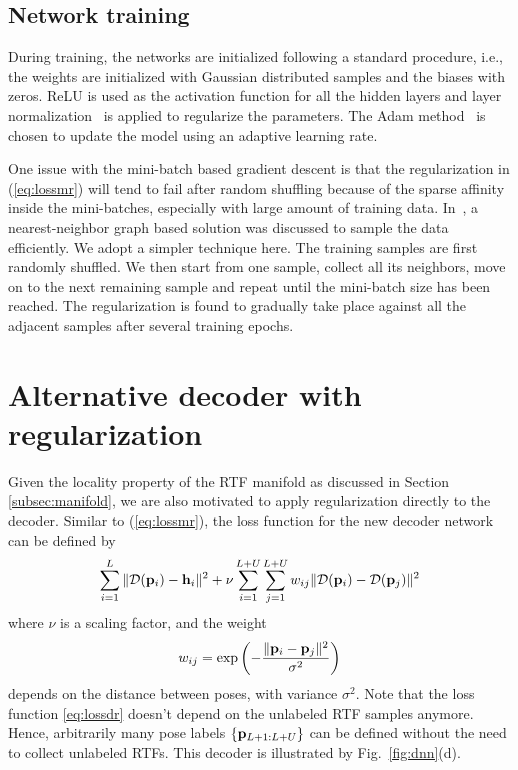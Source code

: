 \documentclass{article}
\begin{document}
\subsection{Network training}
\label{subsec:train}
During training, the networks are initialized following a standard procedure, i.e., the weights are initialized with Gaussian distributed samples and the biases with zeros. ReLU is used as the activation function for all the hidden layers and layer normalization~\cite{ba2016layer} is applied to regularize the parameters. The Adam method~\cite{kingma2014adam} is chosen to update the model using an adaptive learning rate.

One issue with the mini-batch based gradient descent is that the regularization in (\ref{eq:lossmr}) will tend to fail after random shuffling because of the sparse affinity inside the mini-batches, especially with large amount of training data. In~\cite{th2017acoustic}, a nearest-neighbor graph based solution was discussed to sample the data efficiently. We adopt a simpler technique here. The training samples are first randomly shuffled. We then start from one sample, collect all its neighbors, move on to the next remaining sample and repeat until the mini-batch size has been reached. The regularization is found to gradually take place against all the adjacent samples after several training epochs.


\section{Alternative decoder with regularization}
\label{sec:regul}

Given the locality property of the RTF manifold as discussed in Section \ref{subsec:manifold}, we are also motivated to apply regularization directly to the decoder. Similar to (\ref{eq:lossmr}), the loss function for the new decoder network can be defined by
\begin{equation}\label{eq:lossdr}
\sum_{i=1}^{L}\|\mathcal{D}({\bf p}_i)-{\bf h}_i\|^2 + \nu \sum_{i=1}^{L+U}\sum_{j=1}^{L+U}w_{ij}\|\mathcal{D}({\bf p}_i)-\mathcal{D}({\bf p}_j)\|^2
\end{equation}
where $\nu$ is a scaling factor, and the weight
\begin{equation}\label{eq:wij2}
  w_{ij} = \exp\left(-\frac{\|{\bf p}_i-{\bf p}_j\|^2}{\sigma^2}\right)
\end{equation}
depends on the distance between poses, with variance $\sigma^2$. Note that the loss function \eqref{eq:lossdr} doesn't depend on the unlabeled RTF samples anymore. Hence, arbitrarily many pose labels $\{{\bf p}_{L+1:L+U}\}$ can be defined without the need to collect unlabeled RTFs. This decoder is illustrated by Fig.~\ref{fig:dnn}(d).
\end{document}
